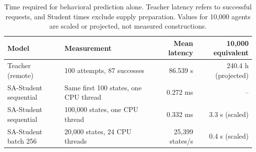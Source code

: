 \begin{table}[pos=htbp]
\centering\small
\caption{Time required for behavioral prediction alone. Teacher latency refers to successful requests, and Student times exclude supply preparation. Values for 10,000 agents are scaled or projected, not measured constructions.}
\label{tab:inference_timing}
\begin{tabularx}{\textwidth}{@{}lXrr@{}}
\toprule
Model & Measurement & Mean latency & 10,000 equivalent \\
\midrule
Teacher (remote) & 100 attempts, 87 successes & 86.539 s & 240.4 h (projected) \\
SA-Student sequential & Same first 100 states, one CPU thread & 0.272 ms & -- \\
SA-Student sequential & 100,000 states, one CPU thread & 0.332 ms & 3.3 s (scaled) \\
SA-Student batch 256 & 20,000 states, 24 CPU threads & 25,399 states/s & 0.4 s (scaled) \\
\bottomrule
\end{tabularx}
\end{table}